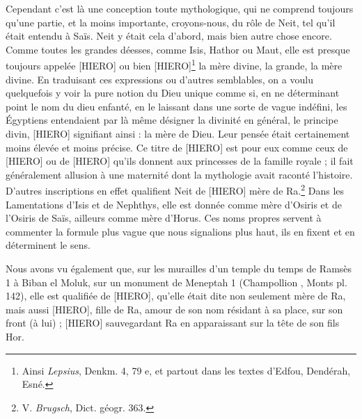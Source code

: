 \documentclass[a4paper, 11pt, oneside]{article}
\begin{document}
Cependant c'est là une conception toute mythologique, qui ne comprend toujours qu'une partie, et la moins importante, croyons-nous, du rôle de Neit, tel qu'il était entendu à Saïs. Neit y était cela d'abord, mais bien autre chose encore. Comme toutes les grandes déesses, comme Isis, Hathor ou Maut, elle est presque toujours appelée [HIERO] ou bien [HIERO]\footnote{Ainsi \emph{Lepsius}, Denkm. 4, 79 e, et partout dans les textes d'Edfou, Dendérah, Esné.} la mère divine, la grande, la mère divine. En traduisant ces expressions ou d'autres semblables, on a voulu quelquefois y voir la pure notion du Dieu unique comme si, en ne déterminant point le nom du dieu enfanté, en le laissant dans une sorte de vague indéfini, les Égyptiens entendaient par là même désigner la divinité en général, le principe divin, [HIERO] signifiant ainsi : la mère de Dieu. Leur pensée était certainement moins élevée et moins précise. Ce titre de [HIERO] est pour eux comme ceux de [HIERO] ou de [HIERO] qu'ils donnent aux princesses de la famille royale ; il fait généralement allusion à une maternité dont la mythologie avait raconté l'histoire. D'autres inscriptions en effet qualifient Neit de [HIERO] mère de Ra.\footnote{V. \emph{Brugsch}, Dict. géogr. 363.} Dans les Lamentations d'Isis et de Nephthys, elle est donnée comme mère d'Osiris et de l'Osiris de Saïs, ailleurs comme mère d'Horus. Ces noms propres servent à commenter la formule plus vague que nous signalions plus haut, ils en fixent et en déterminent le sens.

Nous avons vu également que, sur les murailles d'un temple du temps de Ramsès 1 à Biban el Moluk, sur un monument de Meneptah 1 (Champollion , Monts pl. 142), elle est qualifiée de [HIERO], qu'elle était dite non seulement mère de Ra, mais aussi [HIERO], fille de Ra, amour de son nom résidant à sa place, sur son front (à lui) ; [HIERO] sauvegardant Ra en apparaissant sur la tête de son fils Hor.
\end{document}
